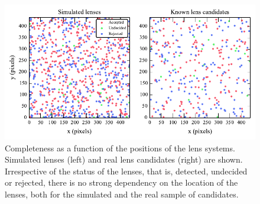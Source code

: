 \documentclass[useAMS,usenatbib,a4paper]{mn2e}
\begin{document}
\begin{figure}
\begin{center}
\includegraphics[scale=0.95]{completeness_pos.pdf}
\caption{ \label{fig:comppos}
Completeness as a function of the positions of the lens systems. Simulated lenses
(left) and real lens candidates (right) are shown. Irrespective of the
status of the lenses, that is, detected, undecided or rejected, there is
no strong dependency on the location of the lenses, both for the
simulated and the real sample of candidates. }
\end{center}
\end{figure}
\end{document}
